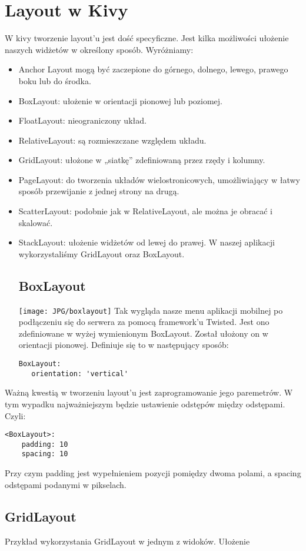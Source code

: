 \documentclass{xmgr}
\begin{document}
\section{Layout w Kivy}
W kivy tworzenie layout'u jest dość specyficzne. Jest kilka możliwości ułożenie naszych widżetów w określony sposób. Wyróżniamy:
\begin{itemize}
\item Anchor Layout mogą być zaczepione do górnego, dolnego, lewego, prawego boku lub do środka.
\item BoxLayout: ułożenie w orientacji pionowej lub poziomej.
\item FloatLayout: nieograniczony układ.
\item RelativeLayout: są rozmieszczane względem układu.
\item GridLayout: ułożone w „siatkę” zdefiniowaną przez rzędy i kolumny.
\item PageLayout: do tworzenia układów wielostronicowych, umożliwiający w łatwy sposób przewijanie z jednej strony na drugą.
\item ScatterLayout: podobnie jak w RelativeLayout, ale można je obracać i skalować.
\item StackLayout: ułożenie widżetów od lewej do prawej.
W naszej aplikacji wykorzystaliśmy GridLayout oraz BoxLayout.
\subsection{BoxLayout}
\texttt{[image: JPG/boxlayout]} 
\newline
Tak wygląda nasze menu aplikacji mobilnej po podłączeniu się do serwera za pomocą framework'u Twisted. Jest ono zdefiniowane w wyżej wymienionym BoxLayout. Został ułożony on w orientacji pionowej. \newline Definiuje się to w następujący sposób:
\begin{lstlisting} 
BoxLayout:
   orientation: 'vertical'
\end{lstlisting}
\end{itemize}
Ważną kwestią w tworzeniu layout'u jest zaprogramowanie jego paremetrów. W tym wypadku najważniejszym będzie ustawienie odstępów między odstępami. Czyli:
\begin{lstlisting} 
<BoxLayout>:
	padding: 10
	spacing: 10
\end{lstlisting}
Przy czym padding jest wypełnieniem pozycji pomiędzy dwoma polami, a spacing odstępami podanymi w pikselach.
\subsection{GridLayout}
Przykład wykorzystania GridLayout w jednym z widoków.  Ułożenie 
\end{document}
